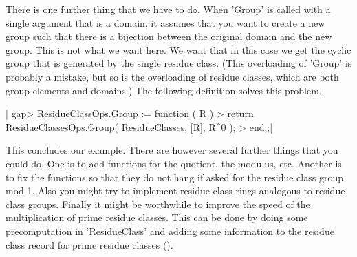 There is  one further thing that we  have to do.  When 'Group' is  called
with a  single  argument  that is a domain, it  assumes that you  want to
create a new  group such that  there is a bijection between  the original
domain and the  new group.  This  is not what we want here.  We want that
in this case  we  get the  cyclic  group that is generated by the  single
residue class.  (This overloading of 'Group'  is probably  a mistake, but
so is the  overloading of residue classes, which  are both group elements
and domains.)  The following definition solves this problem.

|    gap> ResidueClassOps.Group := function ( R )
    >     return ResidueClassesOps.Group( ResidueClasses, [R], R^0 );
    > end;;|

This  concludes our example.   There  are however  several further things
that  you could do.   One  is  to  add  functions  for  the quotient, the
modulus, etc.  Another is to  fix the functions so that  they do not hang
if asked  for the  residue class group  mod  1.   Also you might  try  to
implement residue class rings analogous to residue class groups.  Finally
it  might be worthwhile  to  improve the speed  of the multiplication  of
prime residue classes.   This can be done by doing some precomputation in
'ResidueClass' and adding  some  information  to the residue class record
for prime residue classes (\cite{Mon85}).

